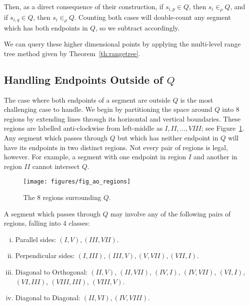 Then, as a direct consequence of their construction, if $s_{i,p} \in Q$, then $s_i \in_\rho Q$, and if $s_{i,q} \in Q$, then $s_i \in_\rho Q$.
Counting both cases will double-count any segment which has both endpoints in $Q$, so we subtract accordingly.

We can query these higher dimensional points by applying the multi-level range tree method given by Theorem~\ref{th:rangetree}.


\subsection{Handling Endpoints Outside of $Q$}
\label{:rectangles:ao:bothout}

The case where both endpoints of a segment are outside $Q$ is the most challenging case to handle.
We begin by partitioning the space around $Q$ into 8 regions by extending lines through its horizontal and vertical boundaries. 
These regions are labelled anti-clockwise from left-middle as $I, II, \ldots, VIII$; see Figure~\ref{fig:rectangles:ao:regions}. 
Any segment which passes through $Q$ but which has neither endpoint in $Q$ will have its endpoints in two distinct regions. 
Not every pair of regions is legal, however.
For example, a segment with one endpoint in region $I$ and another in region $II$ cannot intersect $Q$.

\begin{figure}[t]
\begin{center}
  \texttt{[image: figures/fig\_ao\_regions]}
  \caption{The 8 regions surrounding $Q$.}
  \label{fig:rectangles:ao:regions}
\end{center}
\end{figure}

A segment which passes through $Q$ may involve any of the following pairs of regions, falling into 4 classes:

\begin{enumerate}[i.]
\item Parallel sides: $(I, V), (III, VII)$.
\item Perpendicular sides: $(I, III), (III, V), (V,VII), (VII, I)$.
\item Diagonal to Orthogonal: $(II, V)$, $(II, VII)$, $(IV, I)$, $(IV, VII)$, $(VI, I)$, \newline $(VI, III)$, $(VIII, III)$, $(VIII, V)$.
\item Diagonal to Diagonal: $(II, VI), (IV, VIII)$.
\end{enumerate}


